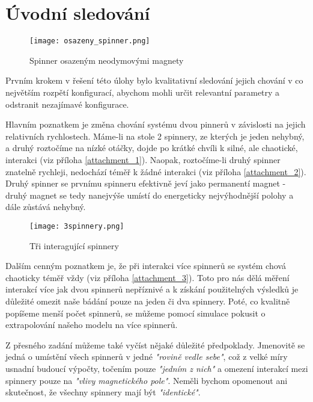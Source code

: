 \chapter{Úvodní sledování}
\begin{wrapfigure}{r}{0.4\textwidth}
    \vspace*{1cm}
    \texttt{[image: osazeny\_spinner.png]}
    \centering
    \caption{Spinner osazeným neodymovými magnety}
    \label{fig:1spinner}
\end{wrapfigure}

Prvním krokem v řešení této úlohy bylo kvalitativní sledování jejich chování v co největším rozpětí konfigurací, abychom mohli určit relevantní parametry a odstranit nezajímavé konfigurace.

Hlavním poznatkem je změna chování systému dvou pinnerů v závislosti na jejich relativních rychlostech.
Máme-li na stole 2 spinnery, ze kterých je jeden nehybný, a druhý roztočíme na nízké otáčky, dojde po krátké chvíli k silné, ale chaotické, interakci (viz příloha \ref{attachment_1}).
Naopak, roztočíme-li druhý spinner znatelně rychleji, nedochází téměř k žádné interakci (viz příloha \ref{attachment_2}).
Druhý spinner se prvnímu spinneru efektivně jeví jako permanentí magnet - druhý magnet se tedy nanejvýše umístí do energeticky nejvýhodnější polohy a dále zůstává nehybný.

\begin{wrapfigure}{l}{0.45\textwidth}
    \vspace*{0.5cm}
    \texttt{[image: 3spinnery.png]}
    \centering
    \caption{Tři interagující spinnery}
    \label{fig:3spinners}
\end{wrapfigure}
Dalším cenným poznatkem je, že při interakci více spinnerů se systém chová chaoticky téměř vždy (viz příloha \ref{attachment_3}).
Toto pro nás dělá měření interakcí více jak dvou spinnerů nepříznivé a k získání použitelných výsledků je důležité omezit naše bádání pouze na jeden či dva spinnery.
Poté, co kvalitně popíšeme menší počet spinnerů, se můžeme pomocí simulace pokusit o extrapolování našeho modelu na více spinnerů.

Z přesného zadání můžeme také vyčíst nějaké důležité předpoklady.
Jmenovitě se jedná o
umístění všech spinnerů v jedné \textit{"rovině vedle sebe"}, což z velké míry usnadní budoucí výpočty,
točením pouze \textit{"jedním z nich"} a
omezení interakcí mezi spinnery pouze na \textit{"vlivy magnetického pole"}.
Neměli bychom opomenout ani skutečnost, že všechny spinnery mají být \textit{"identické"}.

